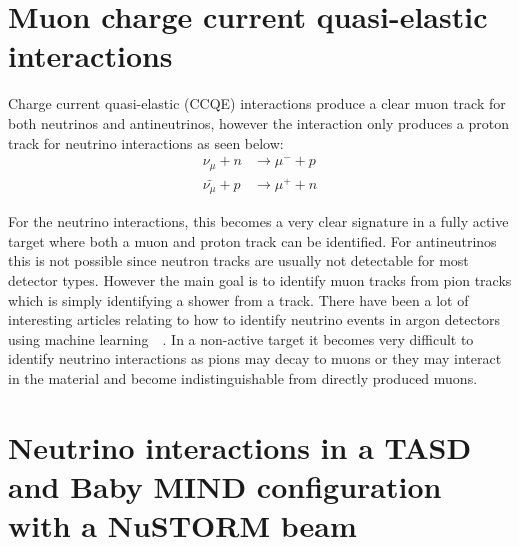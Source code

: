 \section{Muon charge current quasi-elastic interactions}

Charge current quasi-elastic (CCQE) interactions produce a clear muon track for both neutrinos and antineutrinos, however the interaction only produces a proton track for neutrino interactions as seen below:
\begin{align}
\nu_\mu + n &\rightarrow \mu^- + p\\
 \bar{\nu_\mu} + p &\rightarrow \mu^+ + n
\end{align}

For the neutrino interactions, this becomes a very clear signature in a fully active target where both a muon and proton track can be identified. For antineutrinos this is not possible since neutron tracks are usually not detectable for most detector types. However the main goal is to identify muon tracks from pion tracks which is simply identifying a shower from a track. There have been a lot of interesting articles relating to how to identify neutrino events in argon detectors using machine learning~\cite{83Radovic2018}~\cite{84Adams}. In a non-active target it becomes very difficult to identify neutrino interactions as pions may decay to muons or they may interact in the material and become indistinguishable from directly produced muons.





\pagebreak
\section{Neutrino interactions in a TASD and Baby MIND configuration with a NuSTORM beam}

